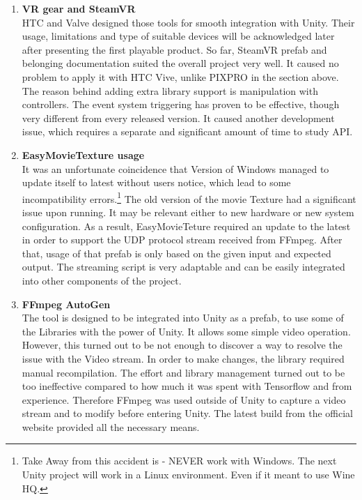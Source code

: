 \begin{enumerate}
    \item \textbf{VR gear and SteamVR} \\
    HTC and Valve designed those tools for smooth integration with Unity.
    Their usage, limitations and type of suitable devices will be acknowledged later after presenting the first playable product.
    So far, SteamVR prefab and belonging documentation suited the overall project very well. 
    It caused no problem to apply it with HTC Vive, unlike PIXPRO in the section above. 
    The reason behind adding extra library support is manipulation with controllers. 
    The event system triggering has proven to be effective, though very different from every released version.
    It caused another development issue, which requires a separate and significant amount of time to study API.
    \item \textbf{EasyMovieTexture usage} \\
    It was an unfortunate coincidence that Version of Windows managed to update itself to latest without users notice, which lead to some incompatibility errors.\footnote{Take Away from this accident is -  NEVER work with Windows. 
    The next Unity project will work in a Linux environment. Even if it meant to use Wine HQ.} 
    The old version of the movie Texture had a significant issue upon running. 
    It may be relevant either to new hardware or new system configuration. 
    As a result, EasyMovieTeture required an update to the latest in order to support the UDP protocol stream received from FFmpeg.
    After that, usage of that prefab is only based on the given input and expected output.
    The streaming script is very adaptable and can be easily integrated into other components of the project.
    \item \textbf{FFmpeg AutoGen} \\
    The tool is designed to be integrated into Unity as a prefab, to use some of the Libraries with the power of Unity.
    It allows some simple video operation.
    However, this turned out to be not enough to discover a way to resolve the issue with the Video stream.
    In order to make changes, the library required manual recompilation.
    The effort and library management turned out to be too ineffective compared to how much it was spent with Tensorflow and from experience.
    Therefore FFmpeg was used outside of Unity to capture a video stream and to modify before entering Unity.
    The latest build from the official website provided all the necessary means.

\end{enumerate}

